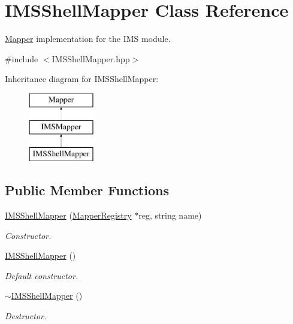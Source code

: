 \hypertarget{classIMSShellMapper}{
\section{IMSShellMapper Class Reference}
\label{classIMSShellMapper}
}


\hyperlink{classMapper}{Mapper} implementation for the IMS module.  




{\ttfamily \#include $<$IMSShellMapper.hpp$>$}

Inheritance diagram for IMSShellMapper:\begin{figure}[H]
\begin{center}
\leavevmode
\includegraphics[height=3.000000cm]{classIMSShellMapper}
\end{center}
\end{figure}
\subsection*{Public Member Functions}
\begin{DoxyCompactItemize}
\item 
\hyperlink{classIMSShellMapper_a8e2402ead734b4a54eead0ae3b8bec9f}{IMSShellMapper} (\hyperlink{classMapperRegistry}{MapperRegistry} $\ast$reg, string name)
\begin{DoxyCompactList}\small\item\em Constructor. \item\end{DoxyCompactList}\item 
\hypertarget{classIMSShellMapper_ab80af5e734b68f704b18818d9f861827}{
\hyperlink{classIMSShellMapper_ab80af5e734b68f704b18818d9f861827}{IMSShellMapper} ()}
\label{classIMSShellMapper_ab80af5e734b68f704b18818d9f861827}

\begin{DoxyCompactList}\small\item\em Default constructor. \item\end{DoxyCompactList}\item 
\hypertarget{classIMSShellMapper_ae4de933568d3c54ba2edc0cb875cbf9e}{
\hyperlink{classIMSShellMapper_ae4de933568d3c54ba2edc0cb875cbf9e}{$\sim$IMSShellMapper} ()}
\label{classIMSShellMapper_ae4de933568d3c54ba2edc0cb875cbf9e}

\begin{DoxyCompactList}\small\item\em Destructor. \item\end{DoxyCompactList}\end{DoxyCompactItemize}


